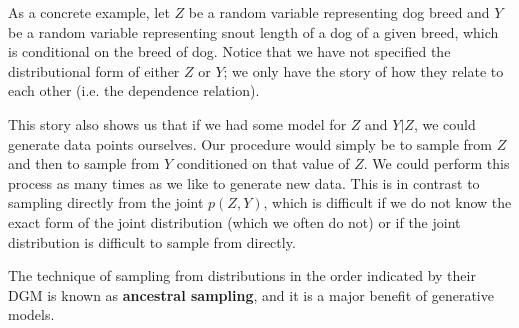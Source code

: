 As a concrete example, let $Z$ be a random variable representing dog breed and $Y$ be a random variable representing snout length of a dog of a given breed, which is conditional on the breed of dog. Notice that we have not specified the distributional form of either $Z$ or $Y$; we only have the story of how they relate to each other (i.e. the dependence relation).

This story also shows us that if we had some model for $Z$ and $Y|Z$, we could generate data points ourselves. Our procedure would simply be to sample from $Z$ and then to sample from $Y$ conditioned on that value of $Z$. We could perform this process as many times as we like to generate new data. This is in contrast to sampling directly from the joint $p(Z, Y)$, which is difficult if we do not know the exact form of the joint distribution (which we often do not) or if the joint distribution is difficult to sample from directly.

The technique of sampling from distributions in the order indicated by their DGM is known as \textbf{ancestral sampling}, and it is a major benefit of generative models.

